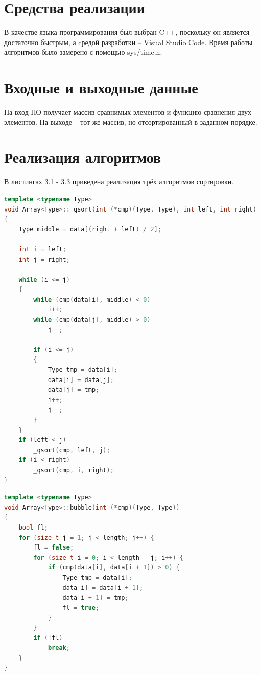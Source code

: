 \documentclass{report}
\begin{document}
\section{Средства реализации}

В качестве языка программирования был выбран C++, поскольку он является достаточно быстрым, а cредой разработки -- Visual Studio Code. Время работы алгоритмов было замерено с помощью sys/time.h.

\section{Входные и выходные данные}
На вход ПО получает массив сравнимых элементов и функцию сравнения двух элементов. На выходе -- тот же массив, но отсортированный в заданном порядке.

\section{Реализация алгоритмов}

В листингах 3.1 - 3.3 приведена реализация трёх алгоритмов сортировки.

\begin{lstlisting}[label=some-code,caption=Функция быстрой сортировки,language=C++]
template <typename Type>
void Array<Type>::_qsort(int (*cmp)(Type, Type), int left, int right)
{
    Type middle = data[(right + left) / 2];

    int i = left;
    int j = right;

    while (i <= j)
    {
        while (cmp(data[i], middle) < 0)
            i++;
        while (cmp(data[j], middle) > 0)
            j--;

        if (i <= j)
        {
            Type tmp = data[i];
            data[i] = data[j];
            data[j] = tmp;
            i++;
            j--;
        }
    }
    if (left < j)
        _qsort(cmp, left, j);
    if (i < right)
        _qsort(cmp, i, right);
}
\end{lstlisting}

\begin{lstlisting}[label=some-code,caption=Функция сортировки массива пузырьком, language=C++]
template <typename Type>
void Array<Type>::bubble(int (*cmp)(Type, Type))
{
    bool fl;
    for (size_t j = 1; j < length; j++) {
        fl = false;
        for (size_t i = 0; i < length - j; i++) {
            if (cmp(data[i], data[i + 1]) > 0) {
                Type tmp = data[i];
                data[i] = data[i + 1];
                data[i + 1] = tmp;
                fl = true;
            }
        }
        if (!fl)
            break;
    }
}
\end{lstlisting}
\end{document}
